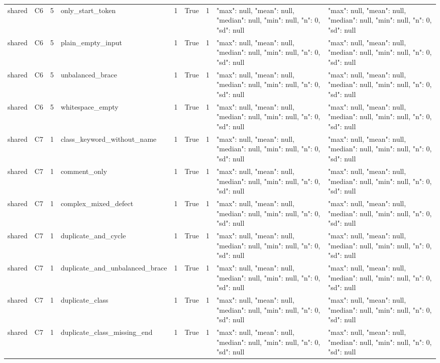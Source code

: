 \begin{tabular}{lllllllll}
shared & C6 & 5 & only\_start\_token & 1 & True & 1 & {"max": null, "mean": null, "median": null, "min": null, "n": 0, "sd": null} & {"max": null, "mean": null, "median": null, "min": null, "n": 0, "sd": null} \\
shared & C6 & 5 & plain\_empty\_input & 1 & True & 1 & {"max": null, "mean": null, "median": null, "min": null, "n": 0, "sd": null} & {"max": null, "mean": null, "median": null, "min": null, "n": 0, "sd": null} \\
shared & C6 & 5 & unbalanced\_brace & 1 & True & 1 & {"max": null, "mean": null, "median": null, "min": null, "n": 0, "sd": null} & {"max": null, "mean": null, "median": null, "min": null, "n": 0, "sd": null} \\
shared & C6 & 5 & whitespace\_empty & 1 & True & 1 & {"max": null, "mean": null, "median": null, "min": null, "n": 0, "sd": null} & {"max": null, "mean": null, "median": null, "min": null, "n": 0, "sd": null} \\
shared & C7 & 1 & class\_keyword\_without\_name & 1 & True & 1 & {"max": null, "mean": null, "median": null, "min": null, "n": 0, "sd": null} & {"max": null, "mean": null, "median": null, "min": null, "n": 0, "sd": null} \\
shared & C7 & 1 & comment\_only & 1 & True & 1 & {"max": null, "mean": null, "median": null, "min": null, "n": 0, "sd": null} & {"max": null, "mean": null, "median": null, "min": null, "n": 0, "sd": null} \\
shared & C7 & 1 & complex\_mixed\_defect & 1 & True & 1 & {"max": null, "mean": null, "median": null, "min": null, "n": 0, "sd": null} & {"max": null, "mean": null, "median": null, "min": null, "n": 0, "sd": null} \\
shared & C7 & 1 & duplicate\_and\_cycle & 1 & True & 1 & {"max": null, "mean": null, "median": null, "min": null, "n": 0, "sd": null} & {"max": null, "mean": null, "median": null, "min": null, "n": 0, "sd": null} \\
shared & C7 & 1 & duplicate\_and\_unbalanced\_brace & 1 & True & 1 & {"max": null, "mean": null, "median": null, "min": null, "n": 0, "sd": null} & {"max": null, "mean": null, "median": null, "min": null, "n": 0, "sd": null} \\
shared & C7 & 1 & duplicate\_class & 1 & True & 1 & {"max": null, "mean": null, "median": null, "min": null, "n": 0, "sd": null} & {"max": null, "mean": null, "median": null, "min": null, "n": 0, "sd": null} \\
shared & C7 & 1 & duplicate\_class\_missing\_end & 1 & True & 1 & {"max": null, "mean": null, "median": null, "min": null, "n": 0, "sd": null} & {"max": null, "mean": null, "median": null, "min": null, "n": 0, "sd": null} \\

\end{tabular}
